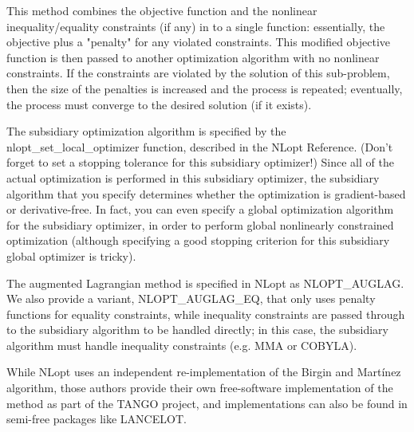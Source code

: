 This method combines the objective function and the nonlinear inequality/equality constraints (if any) in to a single function: essentially, the objective plus a "penalty" for any violated constraints. This modified objective function is then passed to another optimization algorithm with no nonlinear constraints. If the constraints are violated by the solution of this sub-problem, then the size of the penalties is increased and the process is repeated; eventually, the process must converge to the desired solution (if it exists). 

The subsidiary optimization algorithm is specified by the nlopt\_set\_local\_optimizer function, described in the NLopt Reference. (Don't forget to set a stopping tolerance for this subsidiary optimizer!) Since all of the actual optimization is performed in this subsidiary optimizer, the subsidiary algorithm that you specify determines whether the optimization is gradient-based or derivative-free. In fact, you can even specify a global optimization algorithm for the subsidiary optimizer, in order to perform global nonlinearly constrained optimization (although specifying a good stopping criterion for this subsidiary global optimizer is tricky). 

The augmented Lagrangian method is specified in NLopt as NLOPT\_AUGLAG. We also provide a variant, NLOPT\_AUGLAG\_EQ, that only uses penalty functions for equality constraints, while inequality constraints are passed through to the subsidiary algorithm to be handled directly; in this case, the subsidiary algorithm must handle inequality constraints (e.g. MMA or COBYLA). 

While NLopt uses an independent re-implementation of the Birgin and Martínez algorithm, those authors provide their own free-software implementation of the method as part of the TANGO project, and implementations can also be found in semi-free packages like LANCELOT. 






